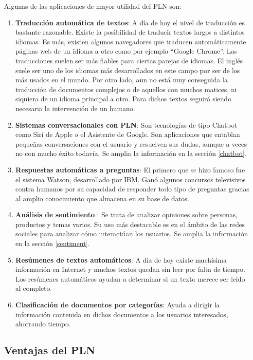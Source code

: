 Algunas de las aplicaciones \citep{appspln} de mayor utilidad del PLN son:

\begin{enumerate}
	\item \textbf{Traducción automática de textos}: A día de hoy el nivel de traducción es bastante razonable. Existe la posibilidad de traducir textos largos a distintos idiomas. Es más, existen algunos navegadores que traducen automáticamente páginas web de un idioma a otro como por ejemplo ``Google Chrome''. Las traducciones suelen ser más fiables para ciertas parejas de idiomas. El inglés suele ser uno de los idiomas más desarrollados en este campo por ser de los más usados en el mundo. Por otro lado, aun no está muy conseguida la traducción de documentos complejos o de aquellos con muchos matices, ni siquiera de un idioma principal a otro. Para dichos textos seguirá siendo necesaria la intervención de un humano.
	\item \textbf{Sistemas conversacionales con PLN}: Son tecnologías de tipo Chatbot como Siri de Apple o el Asistente de Google. Son aplicaciones que entablan pequeñas conversaciones con el usuario y resuelven sus dudas, aunque a veces no con mucho éxito todavía. Se amplia la información en la sección \ref{chatbot}.
	\item \textbf{Respuestas automáticas a preguntas}: El primero que se hizo famoso fue el sistema Watson, desarrollado por IBM. Ganó algunos concursos televisivos contra humanos por su capacidad de responder todo tipo de preguntas gracias al amplio conocimiento que almacena en su base de datos.
	\item \textbf{Análisis de sentimiento} \citep{sentimentanalisis}: Se trata de analizar opiniones sobre personas, productos y temas varios. Su uso más destacable es en el ámbito de las redes sociales para analizar cómo interactúan los usuarios. Se amplia la información en la sección \ref{sentiment}.
	\item \textbf{Resúmenes de textos automáticos}: A día de hoy existe muchísima  información en Internet y muchos textos quedan sin leer por falta de tiempo. Los resúmenes automáticos ayudan a determinar si un texto merece ser leído al completo. 
	\item \textbf{Clasificación de documentos por categorías}: Ayuda a dirigir la información contenida en dichos documentos a los usuarios interesados, ahorrando tiempo. 
\end{enumerate}

\subsection{Ventajas del PLN}

